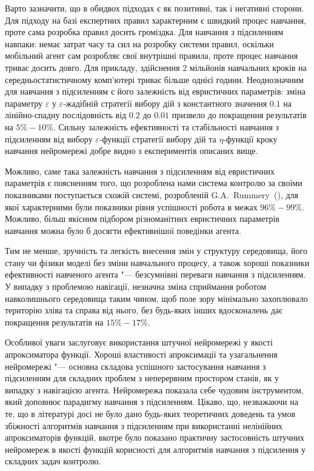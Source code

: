 \documentclass[a4paper,10pt,fleqn]{article}
\begin{document}
Варто зазначити, що в обидвох підходах є як позитивні, так і негативні сторони. Для підходу на базі експертних правил характерним є швидкий процес навчання, проте сама розробка правил досить громіздка. Для навчання з підсиленням навпаки: немає затрат часу та сил на розробку системи правил, оскільки мобільний агент сам розробляє свої внутрішні правила, проте процес навчання триває досить довго. Для прикладу, здійснення 2 мільйонів навчальних кроків на середньостатистичному комп'ютері триває більше однієї години. Неоднозначним для навчання з підсиленням є його залежність від евристичних параметрів: зміна параметру $\varepsilon$ у $\varepsilon$-жадібній стратегії вибору дій з константного значення $0.1$ на лінійно-спадну послідовність від $0.2$ до $0.01$ призвело до покращення результатів на $5\%-10\%$. Сильну залежність ефективності та стабільності навчання з підсиленням від вибору $\varepsilon$-функції стратегії вибору дій та $\eta$-функції кроку навчання нейромережі добре видно з експериментів описаних вище.

Можливо, саме така залежність навчання з підсиленням від евристичних параметрів є поясненням того, що розроблена нами система контролю за своїми показниками поступається схожій системі, розробленій G.A.~Rummery~(\cite{Rummery1995}), для якої характерними були показники рівня успішності робота в межах $96\%-99\%$. Можливо, більш якісним підбором різноманітних евристичних параметрів навчання можна було б досягти ефективнішої поведінки агента.

Тим не менше, зручність та легкість внесення змін у структуру середовища, його стану чи фізики моделі без зміни навчального процесу, а також хороші показники ефективності навченого агента "--- безсумнівні переваги навчання з підсиленням. У випадку з проблемою навігації, незначна зміна сприймання роботом навколишнього середовища таким чином, щоб поле зору мінімально захоплювало територію зліва та справа від нього, без будь-яких інших вдосконалень дає покращення результатів на $15\%-17\%$. 

Особливої уваги заслуговує використання штучної нейромережі у якості апроксиматора функції. Хороші властивості апроксимації та узагальнення нейромережі "--- основна складова успішного застосування навчання з підсиленням для складних проблем з неперервним простором станів, як у випадку з навігацією агента. Нейромережа показала себе чудовим інструментом, який доповнює парадигму навчання з підсиленням. Цікаво, що, незважаючи на те, що в літературі досі не було дано будь-яких теоретичних доведень та умов збіжності алгоритмів навчання з підсиленням при використанні нелінійних апроксиматорів функцій, вкотре було показано практичну застосовність штучних нейромереж в якості функцій корисності для алгоритмів навчання з підсилення у складних задач контролю. 
\end{document}
